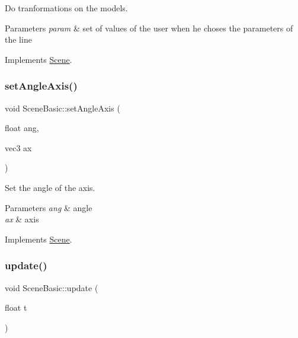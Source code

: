 Do tranformations on the models. 


\begin{DoxyParams}{Parameters}
{\em param} & set of values of the user when he choses the parameters of the line \\
\hline
\end{DoxyParams}


Implements \hyperlink{class_scene_af0c5ec79be9fbb4a6a2554ac4aaaf473}{Scene}.

\hypertarget{class_scene_basic_ae98490655b1c7cffe9ebeca001096b87}{}\label{class_scene_basic_ae98490655b1c7cffe9ebeca001096b87} 
\subsubsection{\texorpdfstring{set\+Angle\+Axis()}{setAngleAxis()}}
{\footnotesize\ttfamily void Scene\+Basic\+::set\+Angle\+Axis (\begin{DoxyParamCaption}\item[{float}]{ang,  }\item[{vec3}]{ax }\end{DoxyParamCaption})\hspace{0.3cm}{\ttfamily [virtual]}}



Set the angle of the axis. 


\begin{DoxyParams}{Parameters}
{\em ang} & angle \\
\hline
{\em ax} & axis \\
\hline
\end{DoxyParams}


Implements \hyperlink{class_scene_ab0c59864d813f7d11a2d362acfdd0e26}{Scene}.

\hypertarget{class_scene_basic_a40b11f479361056d418edbf0a14c9a59}{}\label{class_scene_basic_a40b11f479361056d418edbf0a14c9a59} 
\subsubsection{\texorpdfstring{update()}{update()}}
{\footnotesize\ttfamily void Scene\+Basic\+::update (\begin{DoxyParamCaption}\item[{float}]{t }\end{DoxyParamCaption})\hspace{0.3cm}{\ttfamily [virtual]}}



